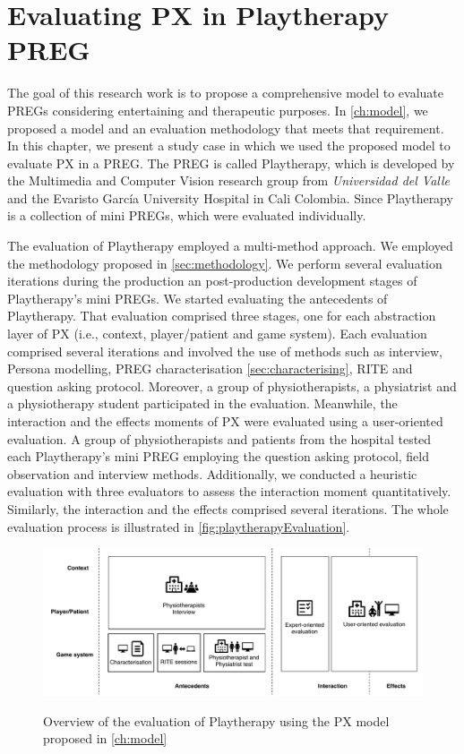 \chapter{Evaluating PX in Playtherapy PREG}
\label{ch:playtherapy}
The goal of this research work is to propose a comprehensive model to evaluate \acp{PREG} considering entertaining and therapeutic purposes. In \autoref{ch:model}, we proposed a model and an evaluation methodology that meets that requirement. In this chapter, we present a study case in which we used the proposed model to evaluate \ac{PX} in a \ac{PREG}. The \ac{PREG} is called Playtherapy, which is developed by the Multimedia and Computer Vision research group from \textit{Universidad del Valle} and the Evaristo Garc\'ia University Hospital in Cali Colombia. Since Playtherapy is a collection of mini \acp{PREG}, which were evaluated individually.

The evaluation of Playtherapy employed a multi-method approach. We employed the methodology proposed in \autoref{sec:methodology}. We perform several evaluation iterations during the production an post-production development stages of Playtherapy's mini \acp{PREG}. We started evaluating the antecedents of Playtherapy. That evaluation comprised three stages, one for each abstraction layer of \ac{PX} (i.e., context, player/patient and game system). Each evaluation comprised several iterations and involved the use of methods such as interview, Persona modelling, \ac{PREG} characterisation \autoref{sec:characterising}, \ac{RITE} and question asking protocol. Moreover, a group of physiotherapists, a physiatrist and a physiotherapy student participated in the evaluation. Meanwhile, the interaction and the effects moments of \ac{PX} were evaluated using a user-oriented evaluation. A group of physiotherapists and patients from the hospital tested each Playtherapy's mini \ac{PREG} employing the question asking protocol, field observation and interview methods. Additionally, we conducted a heuristic evaluation with three evaluators to assess the interaction moment quantitatively. Similarly, the interaction and the effects comprised several iterations. The whole evaluation process is illustrated in \autoref{fig:playtherapyEvaluation}.

\begin{figure}[bth]
\myfloatalign
{\includegraphics[width=\linewidth]{gfx/playtherapy/playtherapyEvaluation}} \quad
\caption[Overview of the evaluation of Playtherapy using the proposed \ac{PX} model]{Overview of the evaluation of Playtherapy using the \ac{PX} model proposed in \autoref{ch:model}}
\label{fig:playtherapyEvaluation}
\end{figure}

